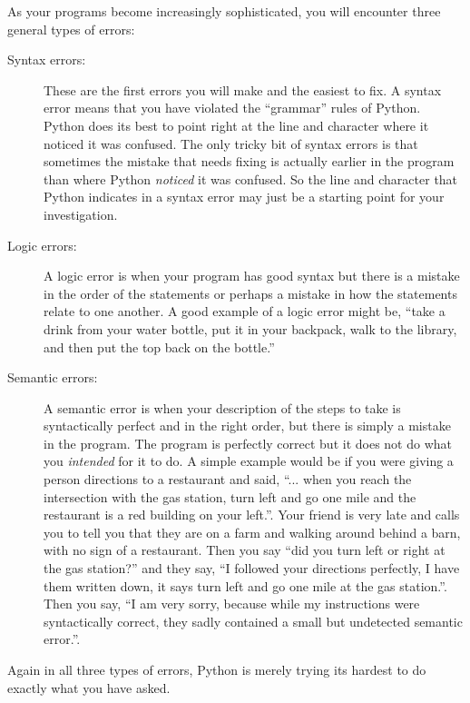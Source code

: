 As your programs become increasingly sophisticated, you will encounter three 
general types of errors:

\begin{description}

\item[Syntax errors:] These are the first errors you will make and the easiest
to fix.  A syntax error means that you have violated the ``grammar'' rules of Python.
Python does its best to point right at the line and character where 
it noticed it was confused.  The only tricky bit of syntax errors is that sometimes
the mistake that needs fixing is actually earlier in the program than where Python
{\em noticed} it was confused.  So the line and character that Python indicates in 
a syntax error may just be a starting point for your investigation.

\item[Logic errors:] A logic error is when your program has good syntax but there is a mistake 
in the order of the statements or perhaps a mistake in how the statements relate to one another.
A good example of a logic error might be, ``take a drink from your water bottle, put it 
in your backpack, walk to the library, and then put the top back on the bottle.''

\item[Semantic errors:] A semantic error is when your description of the steps to take 
is syntactically perfect and in the right order, but there is simply a mistake in 
the program.  The program is perfectly correct but it does not do what
you {\em intended} for it to do. A simple example would
be if you were giving a person directions to a restaurant and said, ``... when you reach
the intersection with the gas station, turn left and go one mile and the restaurant
is a red building on your left.''.  Your friend is very late and calls you to tell you that
they are on a farm and walking around behind a barn, with no sign of a restaurant.  
Then you say ``did you turn left or right at the gas station?'' and 
they say, ``I followed your directions perfectly, I have 
them written down, it says turn left and go one mile at the gas station.''.  Then you say,
``I am very sorry, because while my instructions were syntactically correct, they 
sadly contained a small but undetected semantic error.''. 

\end{description}

Again in all three types of errors, Python is merely trying its hardest to 
do exactly what you have asked.

